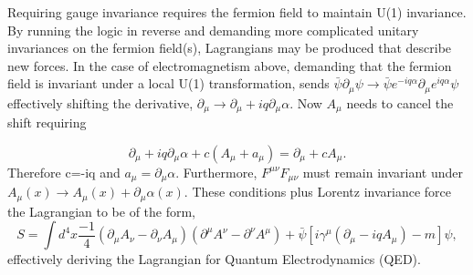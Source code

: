 Requiring gauge invariance requires the fermion field to maintain U(1) invariance. By running the logic in reverse and demanding more complicated unitary invariances on the fermion field(s), Lagrangians may be produced that describe new forces. In the case of electromagnetism above, demanding that the fermion field is invariant under a local U(1) transformation, sends $\bar{\psi}\partial_\mu\psi \rightarrow \bar{\psi} e^{-iq\alpha} \partial_\mu e^{iq\alpha} \psi$ effectively shifting the derivative, $\partial_\mu \rightarrow \partial_\mu + iq\partial_\mu\alpha$. Now $A_\mu$ needs to cancel the shift requiring 

\begin{equation}
\partial_\mu + iq\partial_\mu\alpha + c(A_\mu + a_\mu) = \partial_\mu + cA_\mu. 
\end{equation}
Therefore c=-iq and $a_\mu = \partial_\mu\alpha$. Furthermore, $F^{\mu\nu}F_{\mu\nu}$ must remain invariant under $A_\mu(x) \rightarrow A_\mu(x) + \partial_\mu\alpha(x)$. These conditions plus Lorentz invariance force the Lagrangian to be of the form, 
\begin{equation}
S = \int d^4x \frac{-1}{4}(\partial_\mu A_\nu - \partial_\nu A_\mu)(\partial^\mu A^\nu - \partial^\nu A^\mu) + \bar{\psi}\left[i\gamma^\mu\left(\partial_\mu - iqA_\mu\right) - m \right]\psi, 
\end{equation}
effectively deriving the Lagrangian for Quantum Electrodynamics (QED).

